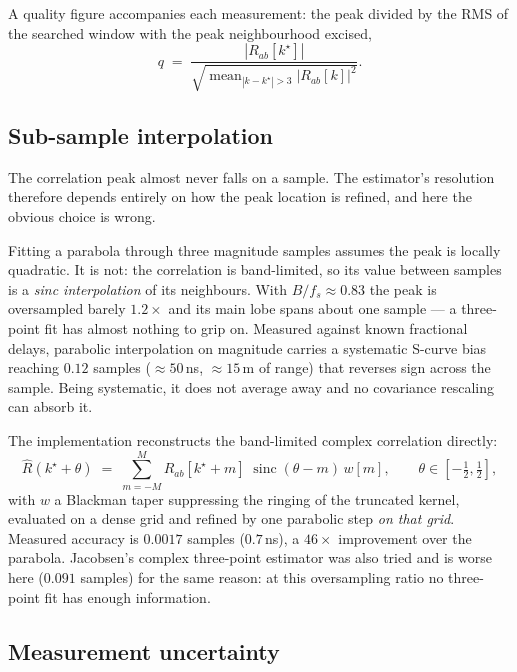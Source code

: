 \documentclass[11pt,a4paper]{article}
\DeclareMathOperator{\sinc}{sinc}
\begin{document}
A quality figure accompanies each measurement: the peak divided by the RMS
of the searched window with the peak neighbourhood excised,
\begin{equation}
  q \;=\; \frac{|R_{ab}[k^\star]|}
       {\sqrt{\operatorname{mean}_{|k-k^\star|>3} |R_{ab}[k]|^{2}}}.
  \label{eq:quality}
\end{equation}

\subsection{Sub-sample interpolation}

The correlation peak almost never falls on a sample. The estimator's
resolution therefore depends entirely on how the peak location is refined,
and here the obvious choice is wrong.

Fitting a parabola through three magnitude samples assumes the peak is
locally quadratic. It is not: the correlation is band-limited, so its value
between samples is a \emph{sinc interpolation} of its neighbours. With
$B/f_s\approx0.83$ the peak is oversampled barely $1.2\times$ and its main
lobe spans about one sample --- a three-point fit has almost nothing to grip
on. Measured against known fractional delays, parabolic interpolation on
magnitude carries a systematic S-curve bias reaching $0.12$ samples
($\approx50$\,ns, $\approx15$\,m of range) that reverses sign across the
sample. Being systematic, it does not average away and no covariance
rescaling can absorb it.

The implementation reconstructs the band-limited complex correlation
directly:
\begin{equation}
  \hat{R}(k^\star+\theta) \;=\; \sum_{m=-M}^{M} R_{ab}[k^\star+m]\;
  \sinc(\theta-m)\, w[m],
  \qquad \theta\in[-\tfrac12,\tfrac12],
\end{equation}
with $w$ a Blackman taper suppressing the ringing of the truncated kernel,
evaluated on a dense grid and refined by one parabolic step \emph{on that
grid}. Measured accuracy is $0.0017$ samples ($0.7$\,ns), a $46\times$
improvement over the parabola. Jacobsen's complex three-point estimator was
also tried and is worse here ($0.091$ samples) for the same reason: at this
oversampling ratio no three-point fit has enough information.

\subsection{Measurement uncertainty}
\label{sec:sigma}
\end{document}
